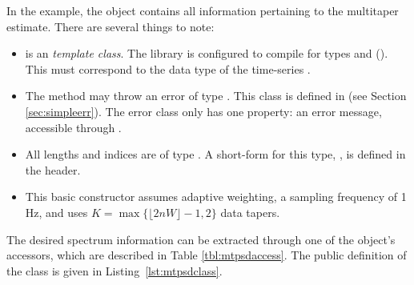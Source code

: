 \noindent In the example, the  object contains all information pertaining to the multitaper estimate.  There are several things to note:
\begin{itemize}
    \item {} is an \emph{template class}.  The library is configured to compile for types  and  ().  This must correspond to the data type of the time-series .
    \item The  method may throw an error of type .  This class is defined in  (see Section \ref{sec:simpleerr}).  The error class only has one property: an error message, accessible through .
    \item All lengths and indices are of type .  A short-form for this type, , is defined in the  header.
    \item This basic constructor assumes adaptive weighting, a sampling frequency of 1 Hz, and uses $K=\max\{\lfloor2nW\rfloor-1,2\}$ data tapers.
\end{itemize}
The desired spectrum information can be extracted through one of the object's accessors, which are described in Table \ref{tbl:mtpsdaccess}.  The public definition of the  class is given in Listing~\ref{lst:mtpsdclass}.
\smallskip

